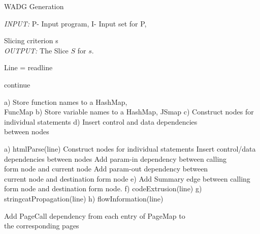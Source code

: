 \documentclass[11pt]{article}   %
\begin{document}
\begin{algorithm}
 
 \caption{WADG Generation}
 
 \textit{INPUT:} P- Input program, I- Input set for P, 
 
  \hspace{1.5cm} Slicing criterion s \\
 
 \textit{OUTPUT:} The Slice $S$ for $s$.\\
 
 \begin{algorithmic}[1]
 

 \State Line = readline
 
  \State continue
  
\State  a)	Store function names to a HashMap,\\
 \hspace{2cm} FuncMap
\State b)	Store variable names to a HashMap, JSmap
\State  c)	Construct nodes for individual statements
\State  d)	Insert control and data dependencies \\
\hspace{2cm} between nodes

 \State a)	htmlParse(line)
 \State Construct nodes for individual statements
 \State	Insert control/data dependencies between nodes
  \State Add param-in dependency between calling\\
  \hspace{3cm} form node and current node
  \EndIf
  \State Add param-out dependency between \\
  \hspace{2.5cm}current node and destination form node
  \EndIf
  \State e)	Add Summary edge between calling form node and destination form node.
  \State f)	codeExtrusion(line)
  \State g)	stringcatPropagation(line)
  \State h)	flowInformation(line)
\EndIf

\EndWhile 
\EndFor
 \State Add PageCall dependency from each entry of PageMap to\\ \hspace{0.2cm}the corresponding pages 

 \end{algorithmic}
 
\end{algorithm}
\end{document}

